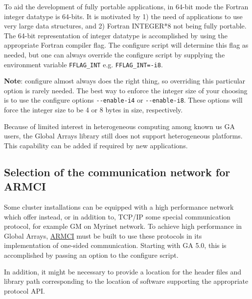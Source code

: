 To aid the development of fully portable applications, in 64-bit mode the
Fortran integer datatype is 64-bits. It is motivated by 1) the need of
applications to use very large data structures, and 2) Fortran INTEGER{*}8 not
being fully portable. The 64-bit representation of integer datatype is
accomplished by using the appropriate Fortran compiler flag. The configure
script will determine this flag as needed, but one can always override the
configure script by supplying the environment variable \texttt{FFLAG\_INT} e.g.
\texttt{FFLAG\_INT=-i8}. 

\textbf{Note}: configure almost always does the right thing, so overriding this
particular option is rarely needed. The best way to enforce the integer size of
your choosing is to use the configure options \texttt{-{}-enable-i4} or
\texttt{-{}-enable-i8}. These options will force the integer size to be 4 or 8
bytes in size, respectively. 

Because of limited interest in heterogeneous computing among known us GA users,
the Global Arrays library still does not support heterogeneous platforms. This
capability can be added if required by new applications. 

\subsection{Selection of the communication network for ARMCI}

Some cluster installations can be equipped with a high performance network
which offer instead, or in addition to, TCP/IP some special communication
protocol, for example GM on Myrinet network. To achieve high performance in
Global Arrays, \href{http://www.emsl.pnl.gov/docs/parsoft/armci}{ARMCI} must be
built to use these protocols in its implementation of one-sided communication.
Starting with GA 5.0, this is accomplished by passing an option to the
configure script. 

In addition, it might be necessary to provide a location for the header files
and library path corresponding to the location of software supporting the
appropriate protocol API. 

